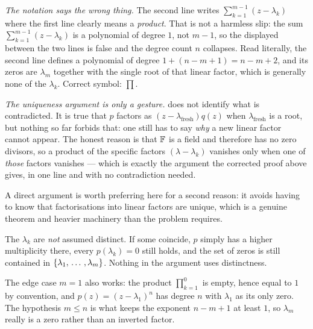 \begin{xrcs}
  \begin{ainote}
    \emph{The notation says the wrong thing.} The second line writes $\sum_{k=1}^{m-1}(z-\lambda_k)$ where the first line clearly means a \emph{product}. That is not a harmless slip: the sum $\sum_{k=1}^{m-1}(z-\lambda_k)$ is a polynomial of degree $1$, not $m-1$, so the displayed  between the two lines is false and the degree count $n$ collapses. Read literally, the second line defines a polynomial of degree $1 + (n-m+1) = n-m+2$, and its zeros are $\lambda_m$ together with the single root of that linear factor, which is generally none of the $\lambda_k$. Correct symbol: $\prod$.

    \emph{The uniqueness argument is only a gesture.}  does not identify what is contradicted. It is true that $p$ factors as $(z-\lambda_{\text{fresh}})q(z)$ when $\lambda_{\text{fresh}}$ is a root, but nothing so far forbids that: one still has to say \emph{why} a new linear factor cannot appear. The honest reason is that $\mathbb{F}$ is a field and therefore has no zero divisors, so a product of the specific factors $(\lambda - \lambda_k)$ vanishes only when one of \emph{those} factors vanishes --- which is exactly the argument the corrected proof above gives, in one line and with no contradiction needed.

    A direct argument is worth preferring here for a second reason: it avoids having to know that factorisations into linear factors are unique, which is a genuine theorem and heavier machinery than the problem requires.
  \end{ainote}
\end{xrcs}

\begin{ainote}
  The $\lambda_k$ are \emph{not} assumed distinct. If some coincide, $p$ simply has a higher multiplicity there, every $p(\lambda_k) = 0$ still holds, and the set of zeros is still contained in $\{\lambda_1, {\, \ldots \,\,}, \lambda_m\}$. Nothing in the argument uses distinctness.

  The edge case $m = 1$ also works: the product $\prod_{k=1}^{0}$ is empty, hence equal to $1$ by convention, and $p(z) = (z-\lambda_1)^n$ has degree $n$ with $\lambda_1$ as its only zero. The hypothesis $m \leq n$ is what keeps the exponent $n-m+1$ at least $1$, so $\lambda_m$ really is a zero rather than an inverted factor.
\end{ainote}

